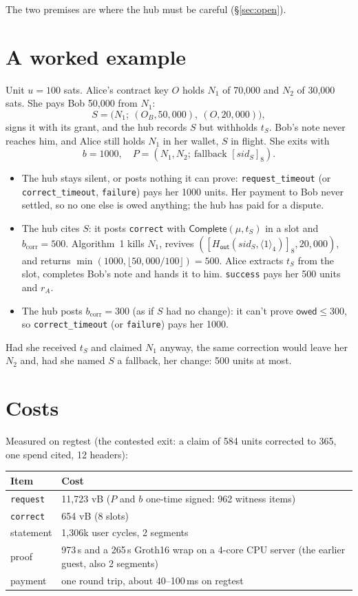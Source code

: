 \documentclass[11pt]{article}
\theoremstyle{plain}
\theoremstyle{definition}
\newcommand{\bcorr}{b_{\mathrm{corr}}}
\newcommand{\tx}[1]{\texttt{#1}}
\newcommand{\be}[2]{\langle #1\rangle_{#2}}          %
\newcommand{\pre}[1]{[#1]_8}                         %
\newcommand{\Ht}[1]{H_{\textsf{#1}}}                 %
\newcommand{\Compl}{\mathsf{Complete}}
\newcommand{\sid}{\mathit{sid}}
\newcommand{\owed}{\mathsf{owed}}
\begin{document}
The two premises are where the hub must be careful (\S\ref{sec:open}).

\section{A worked example}

Unit $u = 100$ sats. Alice's contract key $O$ holds $N_1$ of 70,000 and
$N_2$ of 30,000 sats. She pays Bob 50,000 from $N_1$:
\[
  S = \big(N_1;\ (O_B, 50{,}000),\ (O, 20{,}000)\big),
\]
signs it with its grant, and the hub records $S$ but withholds $t_S$.
Bob's note never reaches him, and Alice still holds $N_1$ in her
wallet, $S$ in flight. She exits with
\[
  b = 1000,\quad P = (N_1, N_2;\ \text{fallback } \pre{\sid_S}).
\]
\begin{itemize}[nosep]
\item The hub stays silent, or posts nothing it can prove:
  \tx{request\_timeout} (or \tx{correct\_timeout}, \tx{failure}) pays her
  1000 units. Her payment to Bob never settled, so no one else is owed
  anything; the hub has paid for a dispute.
\item The hub cites $S$: it posts \tx{correct} with $\Compl(\mu, t_S)$ in
  a slot and $\bcorr = 500$. Algorithm~1 kills $N_1$,
  revives $(\pre{\Ht{out}(\sid_S, \be{1}{4})}, 20{,}000)$, and returns
  $\min(1000, \lfloor 50{,}000/100 \rfloor) = 500$. Alice extracts
  $t_S$ from the slot, completes Bob's note and hands it to him.
  \tx{success} pays her 500 units and $r_A$.
\item The hub posts $\bcorr = 300$ (as if $S$ had no change): it can't
  prove $\owed \le 300$, so \tx{correct\_timeout} (or \tx{failure})
  pays her 1000.
\end{itemize}
Had she received $t_S$ and claimed $N_1$ anyway, the same correction
would leave her $N_2$ and, had she named $S$ a fallback, her change: 500
units at most.

\section{Costs}

Measured on regtest (the contested exit: a claim of 584 units corrected
to 365, one spend cited, 12 headers):

\begin{center}
\begin{tabularx}{0.9\linewidth}{lL}
\toprule
Item & Cost \\
\midrule
\tx{request} & 11,723 vB ($P$ and $b$ one-time signed: 962 witness items) \\
\tx{correct} & 654 vB (8 slots) \\
statement & 1,306k user cycles, 2 segments \\
proof & 973\,s and a 265\,s Groth16 wrap on a 4-core CPU server (the earlier guest, also 2 segments) \\
payment & one round trip, about 40--100\,ms on regtest \\
\bottomrule
\end{tabularx}
\end{center}
\end{document}
